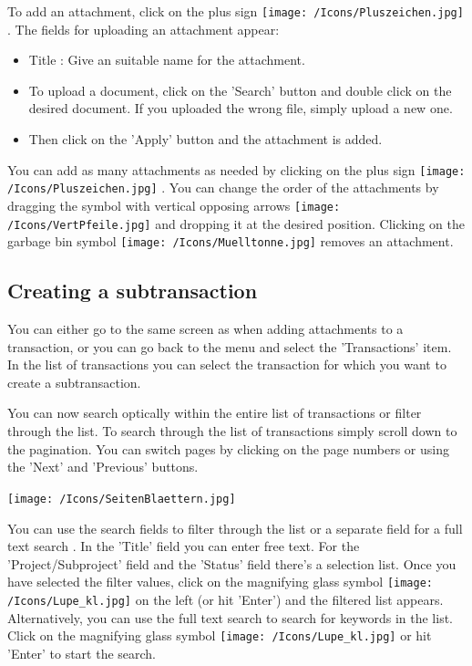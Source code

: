 \vspace{\baselineskip}

To add an attachment, click on the plus sign \texttt{[image: /Icons/Pluszeichen.jpg]} . The fields for uploading an attachment appear:

\begin{itemize}
\item
Title : Give an suitable name for the attachment.
\item
To upload a document, click on the 'Search' button  and double click on the desired document. If you uploaded the wrong file, simply upload a new one.
\item
Then click on the 'Apply' button  and the attachment is added.
\end{itemize}


You can add as many attachments as needed by clicking on the plus sign \texttt{[image: /Icons/Pluszeichen.jpg]} . You can change the order of the attachments by dragging the symbol with vertical opposing arrows \texttt{[image: /Icons/VertPfeile.jpg]}  and dropping it at the desired position. Clicking on the garbage bin symbol \texttt{[image: /Icons/Muelltonne.jpg]}  removes an attachment.


\subsection{Creating a subtransaction}

You can either go to the same screen as when adding attachments to a transaction, or you can go back to the menu and select the 'Transactions' item. In the list of transactions you can select the transaction for which you want to create a subtransaction.

\vspace{\baselineskip}

You can now search optically within the entire list of transactions or filter through the list. To search through the list of transactions simply scroll down to the pagination. You can switch pages by clicking on the page numbers or using the 'Next' and 'Previous' buttons.

\begin{center}
\texttt{[image: /Icons/SeitenBlaettern.jpg]}
\end{center}

You can use the search fields to filter through the list or a separate field for a full text search . In the 'Title' field  you can enter free text. For the 'Project/Subproject' field  and the 'Status' field  there's a selection list. Once you have selected the filter values, click on the magnifying glass symbol \texttt{[image: /Icons/Lupe\_kl.jpg]}  on the left (or hit 'Enter') and the filtered list appears. Alternatively, you can use the full text search to search for keywords in the list. Click on the magnifying glass symbol \texttt{[image: /Icons/Lupe\_kl.jpg]}  or hit 'Enter' to start the search.


